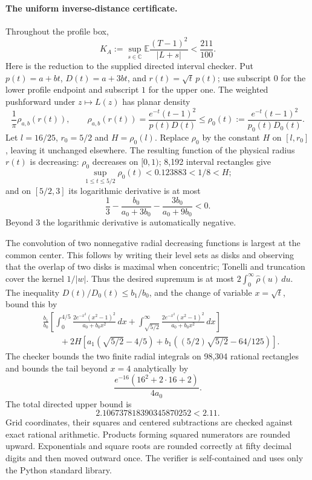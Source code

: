 \paragraph{The uniform inverse-distance certificate.}
Throughout the profile box,
\begin{equation}\label{eq:circular-a-kernel}
 K_A:=\sup_{s\in\mathbb C}\mathbb E
 \frac{(T-1)^2}{|L+s|}<\frac{211}{100}.
\end{equation}
Here is the reduction to the supplied directed interval checker.
Put $p(t)=a+bt$, $D(t)=a+3bt$, and $r(t)=\sqrt t\,p(t)$; use subscript
$0$ for the lower profile endpoint and subscript $1$ for the upper one.
The weighted pushforward under $z\mapsto L(z)$ has planar density
\[
 \frac1\pi\rho_{a,b}(r(t)),\qquad
 \rho_{a,b}(r(t))=\frac{e^{-t}(t-1)^2}{p(t)D(t)}
 \le\rho_0(t):=\frac{e^{-t}(t-1)^2}{p_0(t)D_0(t)}.
\]
Let $l=16/25$, $r_0=5/2$ and $H=\rho_0(l)$. Replace $\rho_0$ by the
constant $H$ on $[l,r_0]$, leaving it unchanged elsewhere. The resulting
function of the physical radius $r(t)$ is decreasing: $\rho_0$ decreases
on $[0,1)$; 8,192 interval rectangles give
\[
 \sup_{1\le t\le5/2}\rho_0(t)<0.123883<1/8<H;
\]
and on $[5/2,3]$ its logarithmic derivative is at most
\[
 \frac13-\frac{b_0}{a_0+3b_0}-\frac{3b_0}{a_0+9b_0}<0.
\]
Beyond $3$ the logarithmic derivative is automatically negative.

The convolution of two nonnegative radial decreasing functions is largest
at the common center. This follows by writing their level sets as disks
and observing that the overlap of two disks is maximal when concentric;
Tonelli and truncation cover the kernel $1/|w|$. Thus the desired supremum
is at most $2\int_0^\infty\widehat\rho(u)\,du$. The inequality
$D(t)/D_0(t)\le b_1/b_0$, and the change of variable $x=\sqrt t$, bound this by
\begin{align*}
 &\frac{b_1}{b_0}\left[
 \int_0^{4/5}\frac{2e^{-x^2}(x^2-1)^2}{a_0+b_0x^2}\,dx+
 \int_{\sqrt{5/2}}^\infty\frac{2e^{-x^2}(x^2-1)^2}{a_0+b_0x^2}\,dx
 \right]\\
 &\qquad+2H\left[
 a_1(\sqrt{5/2}-4/5)+b_1((5/2)\sqrt{5/2}-64/125)
 \right].
\end{align*}
The checker bounds the two finite radial integrals on 98,304 rational
rectangles and bounds the tail beyond $x=4$ analytically by
\[
 \frac{e^{-16}(16^2+2\cdot16+2)}{4a_0}.
\]
The total directed upper bound is
\[
 2.106737818390345870252<2.11.
\]
Grid coordinates, their squares and centered subtractions are checked
against exact rational arithmetic. Products forming squared numerators
are rounded upward. Exponentials and square roots are rounded correctly
at fifty decimal digits and then moved outward once. The verifier is
self-contained and uses only the Python standard library.

